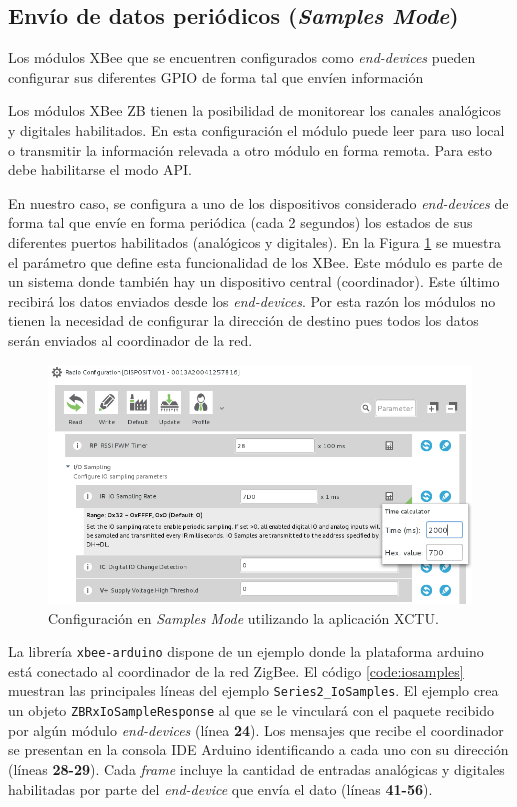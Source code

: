 \documentclass[11pt,oneside,spanish,a4paper]{article}
\begin{document}
\subsection{Envío de datos periódicos (\emph{Samples Mode})}

Los módulos XBee que se encuentren configurados como
\textsl{end-devices} pueden configurar sus diferentes GPIO de forma
tal que envíen información 

Los módulos XBee ZB tienen la posibilidad de monitorear los canales
analógicos y digitales habilitados. En esta configuración el módulo
puede leer para uso local o transmitir la información relevada a otro
módulo en forma remota. Para esto debe habilitarse el modo
API\cite{s2c-ds}.

En nuestro caso, se configura a uno de los dispositivos considerado
\textsl{end-devices} de forma tal que envíe en forma periódica (cada 2
segundos) los estados de sus diferentes puertos habilitados
(analógicos y digitales). En la Figura \ref{fig:iosample-config} se
muestra el parámetro que define esta funcionalidad de los XBee. Este
módulo es parte de un sistema donde también hay un dispositivo central
(coordinador). Este último recibirá los datos enviados desde los
\textsl{end-devices}. Por esta razón los módulos no tienen la
necesidad de configurar la dirección de destino pues todos los datos
serán enviados al coordinador de la red.

\begin{figure}[h]
  \centering
  \includegraphics[width=.8\textwidth]{img/ioSampleConfig}
  \caption{Configuración en \textsl{Samples Mode} utilizando la
    aplicación XCTU.}
  \label{fig:iosample-config}
\end{figure}

La librería \texttt{xbee-arduino} dispone de un ejemplo donde la
plataforma arduino está conectado al coordinador de la red ZigBee. El
código \ref{code:iosamples} muestran las principales líneas del ejemplo
\texttt{Series2\_IoSamples}. El ejemplo crea un objeto
\texttt{ZBRxIoSampleResponse} al que se le vinculará  con el paquete
recibido por algún módulo \textsl{end-devices} (línea
\textbf{24}). Los mensajes que recibe el coordinador se presentan en
la consola IDE Arduino identificando a cada uno con su dirección
(líneas \textbf{28-29}). Cada \textsl{frame} incluye la cantidad de
entradas analógicas y digitales habilitadas por parte del
\textsl{end-device} que envía el dato (líneas \textbf{41-56}).
\end{document}
